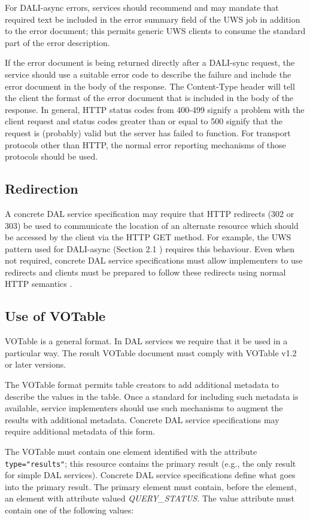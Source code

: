 \documentclass[11pt,letter]{ivoa}
\begin{document}
For DALI-async errors, services should recommend and may mandate that required 
text be included in the error summary field of the UWS job in addition to the 
error document; this permits generic UWS clients to consume the standard part of 
the error description.

If the error document is being returned directly after a DALI-sync request, the 
service should use a suitable error code to describe the failure and include the 
error document in the body of the response. The Content-Type header will tell 
the client the format of the error document that is included in the body of the 
response. In general, HTTP status codes from 400-499 signify a problem with the 
client request and status codes greater than or equal to 500 signify that the 
request is (probably) valid but the server has failed to function. For transport 
protocols other than HTTP, the normal error reporting mechanisms of those 
protocols should be used.

\subsection{Redirection}
\label{sec:redirects}
A concrete DAL service specification may require that HTTP redirects (302 or 
303) be used to communicate the location of an alternate resource which should 
be accessed by the client via the HTTP GET method. For example, the UWS pattern 
used for DALI-async (Section 2.1 ) requires this behaviour. Even when not 
required, concrete DAL service specifications must allow implementers to use 
redirects and clients must be prepared to follow these redirects using normal 
HTTP semantics \citep{std:HTTP}.

\subsection{Use of VOTable}
\label{sec:use-votable}
VOTable is a general format. In DAL services we require that it be used in a 
particular way. The result VOTable document must comply with VOTable v1.2 
\citep{std:VOTABLE}
or later versions.

The VOTable format permits table creators to add additional metadata to describe 
the values in the table. Once a standard for including such metadata is 
available, service implementers should use such mechanisms to augment the 
results with additional metadata. Concrete DAL service specifications may 
require additional metadata of this form.

The VOTable must contain one   element identified with the attribute 
\verb|type="results"|; this resource contains the primary result (e.g., the only result 
for simple DAL services). Concrete DAL service specifications define what goes 
into the primary result. The primary  element must contain, before the 
 element, an 
 element with attribute  valued \emph{QUERY\_STATUS}. The value 
attribute must contain one of the following values:
\end{document}
